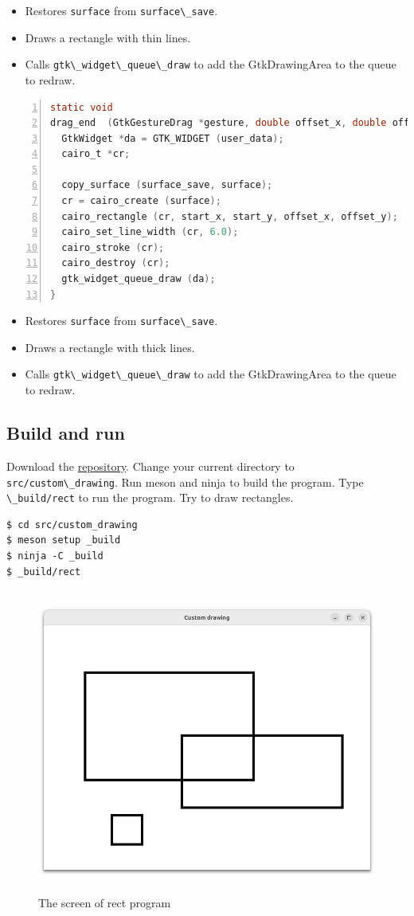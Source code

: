 \begin{itemize}
\tightlist
\item
  Restores \passthrough{\lstinline!surface!} from
  \passthrough{\lstinline!surface\_save!}.
\item
  Draws a rectangle with thin lines.
\item
  Calls \passthrough{\lstinline!gtk\_widget\_queue\_draw!} to add the
  GtkDrawingArea to the queue to redraw.
\end{itemize}

\begin{lstlisting}[language=C, numbers=left]
static void
drag_end  (GtkGestureDrag *gesture, double offset_x, double offset_y, gpointer user_data) {
  GtkWidget *da = GTK_WIDGET (user_data);
  cairo_t *cr;
  
  copy_surface (surface_save, surface);
  cr = cairo_create (surface);
  cairo_rectangle (cr, start_x, start_y, offset_x, offset_y);
  cairo_set_line_width (cr, 6.0);
  cairo_stroke (cr);
  cairo_destroy (cr);
  gtk_widget_queue_draw (da);
}
\end{lstlisting}

\begin{itemize}
\tightlist
\item
  Restores \passthrough{\lstinline!surface!} from
  \passthrough{\lstinline!surface\_save!}.
\item
  Draws a rectangle with thick lines.
\item
  Calls \passthrough{\lstinline!gtk\_widget\_queue\_draw!} to add the
  GtkDrawingArea to the queue to redraw.
\end{itemize}

\subsection{Build and run}\label{build-and-run}

Download the
\href{https://github.com/ToshioCP/Gtk4-tutorial}{repository}. Change
your current directory to \passthrough{\lstinline!src/custom\_drawing!}.
Run meson and ninja to build the program. Type
\passthrough{\lstinline!\_build/rect!} to run the program. Try to draw
rectangles.

\begin{lstlisting}
$ cd src/custom_drawing
$ meson setup _build
$ ninja -C _build
$ _build/rect
\end{lstlisting}

\begin{figure}
\centering
\includegraphics[width=12.4cm,height=10cm]{../image/rect.png}
\caption{The screen of rect program}
\end{figure}
